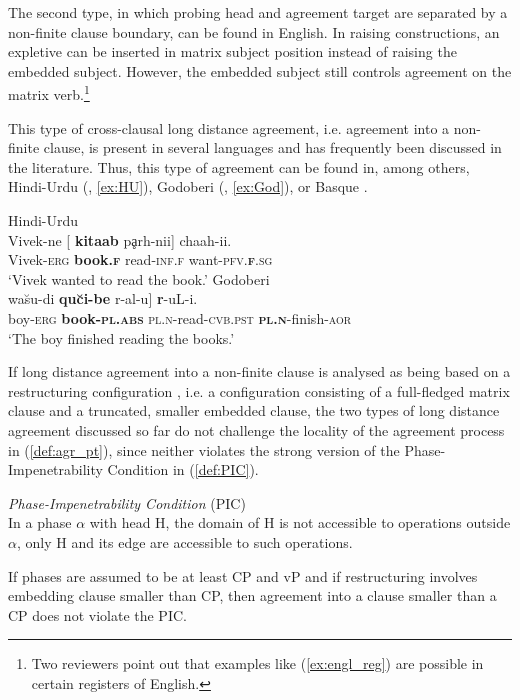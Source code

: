 \documentclass[output=paper
,modfonts
,nonflat]{langsci/langscibook}
\begin{document}
The second type, in which probing head and agreement target are separated by a non-finite clause boundary, can be found in English. In raising constructions, an expletive can be inserted in matrix subject position instead of raising the embedded subject. However, the embedded subject still controls agreement on the matrix verb.\footnote{Two reviewers point out that examples like (\ref{ex:engl_reg}) are possible in certain registers of English.}
\begin{exe}
\ex	
	\xlist
	\endxlist
\end{exe}
This type of cross-clausal long distance agreement, i.e. agreement into a non-finite clause, is present in several languages and has frequently been discussed in the literature. Thus, this type of agreement can be found in, among others, Hindi-Urdu (\citealt{Bhatt2005}, \ref{ex:HU}), Godoberi (\citealt{Haspelmath1999}, \ref{ex:God}), or Basque \citep{Preminger2009}.\largerpage
\begin{exe}
\ex
	\xlist
	\ex Hindi-Urdu \citep[][760]{Bhatt2005}\label{ex:HU}\\
		\gll Vivek-ne {[} \textbf{kitaab} pḁrh-nii] chaah-ii.\\
		 Vivek-\textsc{erg} {} \textbf{book.\textsc{f}} read-\textsc{inf.f} want-\textsc{pfv.\textbf{f}.sg}\\
		\glt `Vivek wanted to read the book.' \hfill 
	\ex	Godoberi  \citep[][136]{Haspelmath1999}\label{ex:God}\\
		\gll {[} wa\u{s}u-di \textbf{qu\u{c}i-be} r-al-u] \textbf{r}-uL-i.\\
		 {} boy-\textsc{erg} \textbf{book-\textsc{pl.abs}} \textsc{pl.n}-read-\textsc{cvb.pst} \textbf{\textsc{pl.n}}-finish-\textsc{aor}\\
		\glt `The boy finished reading the books.' \hfill
	\endxlist
\end{exe}
If long distance agreement into a non-finite clause is analysed as being based on a restructuring configuration \citep{Wurmbrand2001}, i.e. a configuration consisting of a full-fledged matrix clause and a truncated, smaller embedded clause, the two types of long distance agreement discussed so far do not challenge the locality of the agreement process in (\ref{def:agr_pt}), since neither violates the strong version of the Phase-Impenetrability Condition in (\ref{def:PIC}).
\begin{exe} 
	\ex \label{def:PIC} \textit{Phase-Impenetrability Condition} (PIC) \citep{Chomsky2001}\\
	In a phase $ \alpha $ with head H, the domain of H is not accessible to operations outside $ \alpha $, only H and its edge are accessible to such operations.
\end{exe}
If phases are assumed to be at least CP and vP and if restructuring involves embedding clause smaller than CP, then agreement into a clause smaller than a CP does not violate the PIC.
\end{document}
